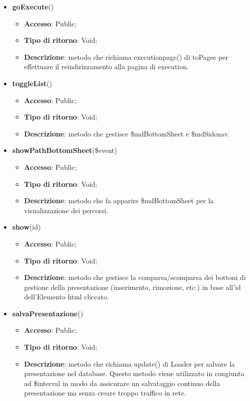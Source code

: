 {{\begin{itemize}
\begin{itemize}
			\end{itemize}
			\item \textbf{goExecute}()
			\begin{itemize}
				\item \textbf{Accesso}: Public;
				\item \textbf{Tipo di ritorno}: Void;
				\item \textbf{Descrizione}: metodo che richiama executionpage() di toPages per effettuare il reindirizzamento alla pagina di execution.
			\end{itemize}
			\item \textbf{toggleList}()
			\begin{itemize}
				\item \textbf{Accesso}: Public;
				\item \textbf{Tipo di ritorno}: Void;
				\item \textbf{Descrizione}: metodo che gestisce \$mdBottomSheet e \$mdSidenav.
			\end{itemize}
			\item \textbf{showPathBottomSheet}(\$event)
			\begin{itemize}
				\item \textbf{Accesso}: Public;
				\item \textbf{Tipo di ritorno}: Void;
				\item \textbf{Descrizione}: metodo che fa apparire \$mdBottomSheet per la visualizzazione dei percorsi.
			\end{itemize}
			\item \textbf{show}(id)
			\begin{itemize}
				\item \textbf{Accesso}: Public;
				\item \textbf{Tipo di ritorno}: Void;
				\item \textbf{Descrizione}: metodo che gestisce la comparsa/scomparsa dei bottoni di gestione della presentazione (inserimento, rimozione, etc.) in base all'id dell'Elemento html cliccato.
			\end{itemize}
			\item \textbf{salvaPresentazione}()
			\begin{itemize}
				\item \textbf{Accesso}: Public;
				\item \textbf{Tipo di ritorno}: Void;
				\item \textbf{Descrizione}: metodo che richiama update() di Loader per salvare la presentazione nel database. Questo metodo viene utilizzato in congiunta ad \$interval in modo da assicurare un salvataggio continuo della presentazione ma senza creare troppo traffico in rete.

\end{itemize}
\end{itemize}}}

